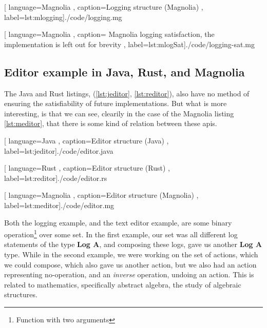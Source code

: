 \begin{center}
  
    [ language=Magnolia
    , caption={Logging structure (Magnolia)}
    , label=lst:mlogging]{./code/logging.mg}
\end{center}

\begin{center}
  
    [ language=Magnolia
    , caption={
        Magnolia logging satisfaction, the implementation is left out for
        brevity
      }
    , label=lst:mlogSat]{./code/logging-sat.mg}
\end{center}

\subsection{Editor example in Java, Rust, and Magnolia}

The Java and Rust listings, (\ref{lst:jeditor}, \ref{lst:reditor}), also have no
method of ensuring the satisfiability of future implementations. But what is
more interesting, is that we can see, clearily in the case of the Magnolia
listing \ref{lst:meditor}, that there is some kind of relation between these
\gls*{api}s.

\begin{code}[H]
  
    [ language=Java
    , caption={Editor structure (Java)}
    , label=lst:jeditor]{./code/editor.java}
\end{code}

\begin{code}[H]
  
    [ language=Rust
    , caption={Editor structure (Rust)}
    , label=lst:reditor]{./code/editor.rs}
\end{code}

\begin{code}[H]
  
    [ language=Magnolia
    , caption={Editor structure (Magnolia)}
    , label=lst:meditor]{./code/editor.mg}
\end{code}

Both the logging example, and the text editor example, are some binary operation\footnote{Function with two arguments}
over some set. In the first example, our set was all different log statements of
the type \textbf{Log A}, and composing these logs, gave us another
\textbf{Log A} type. While in the second example, we were working on the set of
actions, which we could compose, which also gave us another action, but we also
had an action representing no-operation, and an \textit{inverse} operation,
undoing an action. This is related to mathematics, specifically abstract
algebra, the study of algebraic structures.

